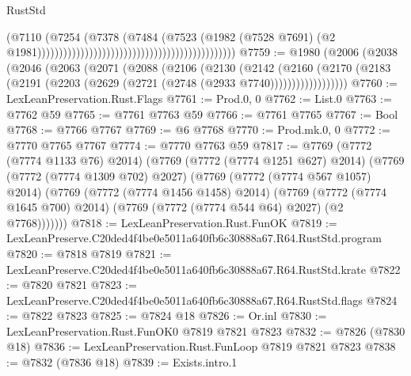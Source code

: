 \begin{lexlean}{RustStd}
\begin{coremodule}
                                                                                  (@7110
                                                                                    (@7254
                                                                                      (@7378
                                                                                        (@7484
                                                                                          (@7523
                                                                                            (@1982
                                                                                              (@7528
                                                                                                @7691)
                                                                                              (@2
                                                                                                @1981))))))))))))))))))))))))))))))))))))))))))))))
@7759 := @1980
    (@2006
      (@2038
        (@2046
          (@2063
            (@2071
              (@2088
                (@2106
                  (@2130
                    (@2142
                      (@2160
                        (@2170
                          (@2183 (@2191 (@2203 (@2629 (@2721 (@2748 (@2933 @7740))))))))))))))))))
@7760 := LexLeanPreservation.Rust.Flags
@7761 := Prod.{0, 0}
@7762 := List.{0}
@7763 := @7762 @59
@7765 := @7761 @7763 @59
@7766 := @7761 @7765
@7767 := Bool
@7768 := @7766 @7767
@7769 := @6 @7768
@7770 := Prod.mk.{0, 0}
@7772 := @7770 @7765 @7767
@7774 := @7770 @7763 @59
@7817 := @7769
    (@7772 (@7774 @1133 @76) @2014)
    (@7769
      (@7772 (@7774 @1251 @627) @2014)
      (@7769
        (@7772 (@7774 @1309 @702) @2027)
        (@7769
          (@7772 (@7774 @567 @1057) @2014)
          (@7769
            (@7772 (@7774 @1456 @1458) @2014)
            (@7769
              (@7772 (@7774 @1645 @700) @2014)
              (@7769 (@7772 (@7774 @544 @64) @2027) (@2 @7768)))))))
@7818 := LexLeanPreservation.Rust.FunOK
@7819 := LexLeanPreserve.C20ded4f4be0e5011a640fb6c30888a67.R64.RustStd.program
@7820 := @7818 @7819
@7821 := LexLeanPreserve.C20ded4f4be0e5011a640fb6c30888a67.R64.RustStd.krate
@7822 := @7820 @7821
@7823 := LexLeanPreserve.C20ded4f4be0e5011a640fb6c30888a67.R64.RustStd.flags
@7824 := @7822 @7823
@7825 := @7824 @18
@7826 := Or.inl
@7830 := LexLeanPreservation.Rust.FunOK0 @7819 @7821 @7823
@7832 := @7826 (@7830 @18)
@7836 := LexLeanPreservation.Rust.FunLoop @7819 @7821 @7823
@7838 := @7832 (@7836 @18)
@7839 := Exists.intro.{1}

\end{coremodule}
\end{lexlean}
